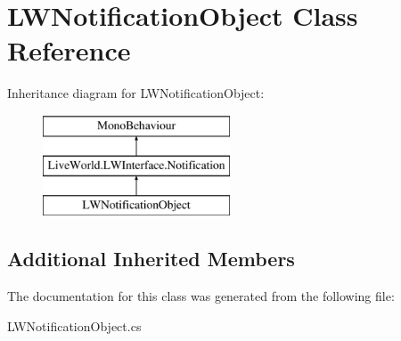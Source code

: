 \hypertarget{class_l_w_notification_object}{}\section{L\+W\+Notification\+Object Class Reference}
\label{class_l_w_notification_object}
Inheritance diagram for L\+W\+Notification\+Object\+:\begin{figure}[H]
\begin{center}
\leavevmode
\includegraphics[height=3.000000cm]{class_l_w_notification_object}
\end{center}
\end{figure}
\subsection*{Additional Inherited Members}


The documentation for this class was generated from the following file\+:\begin{DoxyCompactItemize}
\item 
L\+W\+Notification\+Object.\+cs\end{DoxyCompactItemize}
